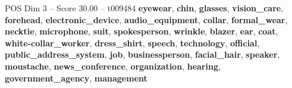 \begin{textsample}{POS Dim 3 – Score 30.00 – t009484}  \label{ex:f3_pos_029}
\textbf{eyewear}, \textbf{chin}, \textbf{glasses}, \textbf{vision\_care}, \textbf{forehead}, \textbf{electronic\_device}, \textbf{audio\_equipment}, \textbf{collar}, \textbf{formal\_wear}, \textbf{necktie}, \textbf{microphone}, \textbf{suit}, \textbf{spokesperson}, \textbf{wrinkle}, \textbf{blazer}, \textbf{ear}, \textbf{coat}, \textbf{white-collar\_worker}, \textbf{dress\_shirt}, \textbf{speech}, \textbf{technology}, \textbf{official}, \textbf{public\_address\_system}, \textbf{job}, \textbf{businessperson}, \textbf{facial\_hair}, \textbf{speaker}, \textbf{moustache}, \textbf{news\_conference}, \textbf{organization}, \textbf{hearing}, \textbf{government\_agency}, \textbf{management}

\end{textsample}

